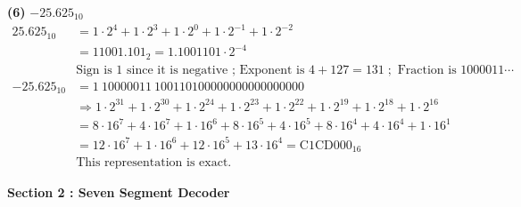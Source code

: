 \documentclass[11pt]{article}
\begin{document}
\noindent \textbf{(6) } $-25.625_{10}$
\begin{equation}
    \begin{split}
        25.625_{10} &= 1 \cdot 2^4 + 1 \cdot 2^3 + 1 \cdot 2^0 + 1 \cdot 2^{-1} + 1 \cdot 2^{-2} \\
        &= 11001.101_2 = 1.1001101 \cdot 2^{-4}\\
        & \text{Sign is 1 since it is negative ; Exponent is } 4 + 127 = 131 \; ; \text{ Fraction is } 1000011 \cdots\\
        -25.625_{10} &= 1 \: 10000011 \: 100110100000000000000000\\
        & \Rightarrow 1 \cdot 2^{31} + 1 \cdot 2^{30} + 1 \cdot 2^{24} + 1 \cdot 2^{23} + 1 \cdot 2^{22} + 1 \cdot 2^{19} + 1 \cdot 2^{18} + 1 \cdot 2^{16}\\
        &= 8 \cdot 16^7 + 4 \cdot 16^7 + 1 \cdot 16^6 + 8 \cdot 16^5 + 4 \cdot 16^5 + 8 \cdot 16^4 + 4 \cdot 16^4 + 1 \cdot 16^1\\
        &= 12 \cdot 16^7 + 1 \cdot 16^6 + 12 \cdot 16^5 + 13 \cdot 16^4 = \text{C1CD000}_16\\
        &\text{This representation is exact.} 
    \end{split}
\end{equation}
\newpage

\noindent \textbf{\large{Section 2 : Seven Segment Decoder}}
\\
\end{document}

